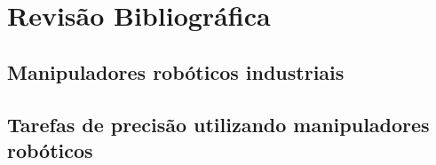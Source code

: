 \chapter{Revisão Bibliográfica}

% 

\section{Manipuladores robóticos industriais}


\section{Tarefas de precisão utilizando manipuladores robóticos}

